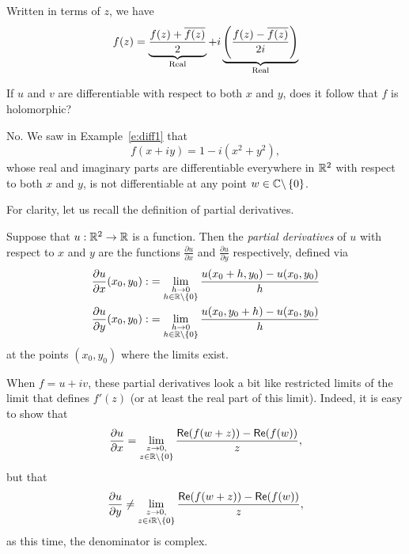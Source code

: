 Written in terms of $z$, we have
\[
f(z) = \underbrace{\frac{f(z)+\overline{f(z)}}{2}}_{\text{Real}} + i \underbrace{\left(\frac{f(z)-\overline{f(z)}}{2i} \right)}_{\text{Real}}
\]



\begin{example}
If $u$ and $v$ are differentiable with respect to both $x$ and $y$, does it follow that $f$ is holomorphic?  
\end{example}

\begin{solution}
No.  We saw in Example~\ref{e:diff1} that
\[
f(x+iy) = 1-i (x^2+y^2),
\]
whose real and imaginary parts are differentiable everywhere in $\mathbb{R}^2$ with respect to both $x$ and $y$, is not differentiable at any point $w \in \mathbb{C} \backslash \left\{0\right\}$.
\end{solution}

For clarity, let us recall the definition of partial derivatives.



\begin{definition}
Suppose that $u: \mathbb{R}^2 \to \mathbb{R}$ is a function.  Then the \emph{partial derivatives} of $u$ with respect to $x$ and $y$ are the functions $\frac{\partial u}{\partial x}$ and $\frac{\partial u}{\partial y}$ respectively, defined via
\begin{align*}
\frac{\partial u}{\partial x} (x_0,y_0):&= \lim_{\substack{h\to 0\\h \in \mathbb{R} \backslash \left\{0\right\}}} \frac{u(x_0+h,y_0)-u(x_0,y_0)}{h}\\
\frac{\partial u}{\partial y} (x_0,y_0):&= \lim_{\substack{h\to 0\\h \in \mathbb{R} \backslash \left\{0\right\}}} \frac{u(x_0,y_0+h)-u(x_0,y_0)}{h}
\end{align*}
at the points $(x_0,y_0)$ where the limits exist.
\end{definition}

When $f=u+iv$, these partial derivatives look a bit like restricted limits of the limit that defines $f'(z)$ (or at least the real part of this limit).  Indeed, it is easy to show that
\[
\dfrac{\partial u}{\partial x} = \lim_{\substack{z \to 0, \\  z \in \mathbb{R} \backslash \left\{0\right\} }} \frac{\textsf{Re} (f(w+z)) - \textsf{Re}(f(w))}{z},
\]
but that
\[
\dfrac{\partial u}{\partial y} \neq \lim_{\substack{ z \to 0 , \\ z \in i \mathbb{R} \backslash \left\{0\right\} }} \frac{\textsf{Re} (f(w+z)) - \textsf{Re}(f(w))}{z},
\]
as this time, the denominator is complex.




